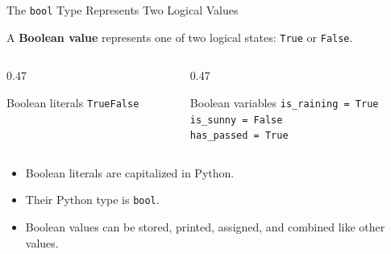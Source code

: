 \documentclass[aspectratio=169,10pt]{beamer}
\begin{document}
\begin{frame}{The \texttt{bool} Type Represents Two Logical Values}
  \begin{cpdefinition}
    A \textbf{Boolean value} represents one of two logical states: \texttt{True} or \texttt{False}.
  \end{cpdefinition}

  \begin{columns}[T,onlytextwidth]
    \begin{column}{0.47\textwidth}
      \begin{block}{Boolean literals}
        \centering
        \Large\texttt{True}\qquad\Large\texttt{False}
      \end{block}
    \end{column}

    \begin{column}{0.47\textwidth}
      \begin{block}{Boolean variables}
        \texttt{is\_raining = True}\\
        \texttt{is\_sunny = False}\\
        \texttt{has\_passed = True}
      \end{block}
    \end{column}
  \end{columns}

  \begin{itemize}
    \item Boolean literals are capitalized in Python.
    \item Their Python type is \texttt{bool}.
    \item Boolean values can be stored, printed, assigned, and combined like other values.
  \end{itemize}
\end{frame}
\end{document}
